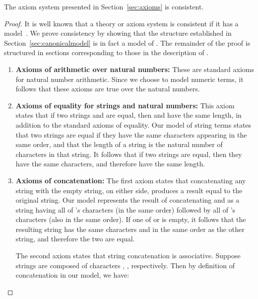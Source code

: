 \begin{Theorem}
  The axiom system  presented in Section~\ref{sec:axioms} is consistent.
\end{Theorem}

\begin{proof}
  It is well known that a theory or axiom system is consistent if it
  has a model~\cite{HodgesModelTheory}.  We prove consistency by
  showing that the structure established in
  Section~\ref{sec:canonicalmodel} is in fact a model of . The
  remainder of the proof is structured in sections corresponding to
  those in the description of .

  \begin{enumerate}
    

  \item \textbf{Axioms of arithmetic over natural numbers:} These are
   standard axioms for natural number arithmetic.  Since we choose
    to model numeric terms, it follows that these axioms
   are true over the natural numbers.


 \item \textbf{Axioms of equality for strings and natural numbers:}
   This axiom states that if two strings  and  are equal, then
    and  have the same length, in addition to the standard
   axioms of equality. Our model of string terms states that two
   strings are equal if they have the same characters appearing in the
   same order, and that the length of a string is the natural number
   of characters in that string.  It follows that if two strings are
   equal, then they have the same characters, and therefore have the
   same length.


 \item \textbf{Axioms of concatenation:} The first axiom states that
   concatenating any string with the empty string, on either side,
   produces a result equal to the original string.  Our model
   represents the result of concatenating  and  as a string
   having all of 's characters (in the same order) followed by all
   of 's characters (also in the same order). If one of  or 
   is empty, it follows that the resulting string has the same
   characters and in the same order as the other string, and therefore
   the two are equal.

   The second axiom states that string concatenation is associative.
   Suppose strings  are composed of characters , ,  respectively. Then by
   definition of concatenation in our model, we have:

  


\end{enumerate}
\end{proof}
